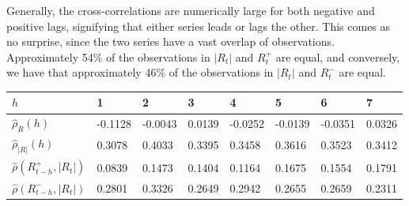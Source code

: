 Generally, the cross-correlations are numerically large for both negative and positive lags, signifying that either series leads or lags the other. This comes as no surprise, since the two series have a vast overlap of observations. Approximately 54\% of the observations in $|R_{t}|$ and $R^{+}_{t}$ are equal, and conversely, we have that approximately 46\% of the observations in $|R_{t}|$ and $R^{-}_{t}$ are equal. 

\begin{table}[H]
\centering
\begin{tabular}{llllllll}
\hline
$h$ & 1 & 2 & 3 & 4 & 5 & 6 & 7 \\ \hline
$\hat{\rho}_{R}(h)$ & -0.1128 & -0.0043 & 0.0139 & -0.0252 & -0.0139 & -0.0351 & 0.0326 \\
$\hat{\rho}_{|R|}(h)$ & 0.3078 & 0.4033 & 0.3395 & 0.3458 & 0.3616 & 0.3523 & 0.3412\\
$\hat{\rho}\left(R^{+}_{t-h},|R_{t}|\right)$ & 0.0839 & 0.1473 & 0.1404 & 0.1164 & 0.1675 & 0.1554 & 0.1791\\ 
$\hat{\rho}\left(R^{-}_{t-h},|R_{t}|\right)$ & 0.2801 & 0.3326 & 0.2649 & 0.2942 & 0.2655 & 0.2659 & 0.2311 \\ \hline
\end{tabular}
\end{table}

